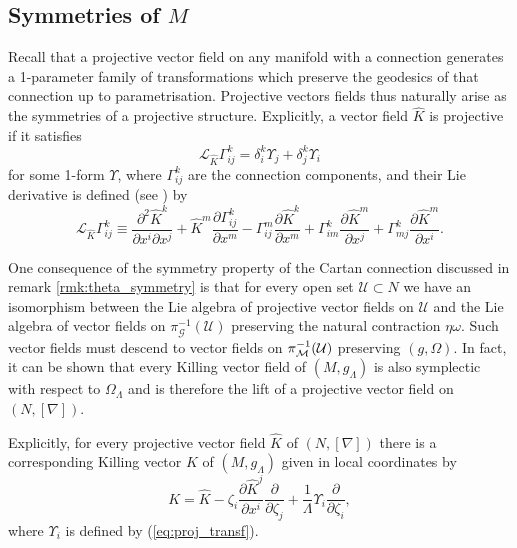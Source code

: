 \subsection{Symmetries of $M$}

Recall that a projective vector field on any manifold with a connection
generates a 1-parameter family of transformations which preserve the
geodesics of that connection up to parametrisation. Projective vectors
fields thus naturally arise as the symmetries of a projective structure.
Explicitly, a vector field $\widehat{K}$ is projective if it satisfies
\begin{equation}
\mathcal{L}_{\widehat{K}}\Gamma_{ij}^{k}=\delta_{i}^{k}\Upsilon_{j}+\delta_{j}^{k}\Upsilon_{i}\label{eq:proj_transf}
\end{equation}
for some 1-form $\Upsilon$, where $\Gamma_{ij}^{k}$ are the connection
components, and their Lie derivative is defined (see \cite{yano})
by
\begin{equation}
\mathcal{L}_{\widehat{K}}\Gamma_{ij}^{k}\equiv\frac{\partial^{2}\widehat{K}^{k}}{\partial x^{i}\partial x^{j}}+\widehat{K}^{m}\frac{\partial\Gamma_{ij}^{k}}{\partial x^{m}}-\Gamma_{ij}^{m}\frac{\partial \widehat{K}^{k}}{\partial x^{m}}+\Gamma_{im}^{k}\frac{\partial \widehat{K}^{m}}{\partial x^{j}}+\Gamma_{mj}^{k}\frac{\partial \widehat{K}^{m}}{\partial x^{i}}.\label{eq:liederivGamma}
\end{equation}


One consequence of the symmetry property of the Cartan connection discussed in remark \ref{rmk:theta_symmetry} is that for every open set $\mathcal{U}\subset N$ we have an isomorphism between the Lie algebra of projective vector fields on $\mathcal{U}$ and the Lie algebra of vector fields on $\pi_\mathcal{G}^{-1}(\mathcal{U})$ preserving the natural contraction $\eta\omega$. Such vector fields must descend to vector fields on $\pi_{\mathcal{M}}^{-1}(\mathcal{U})$ preserving $(g,\Omega)$. In fact, it can be shown that every Killing vector field of $(M,g_\Lambda)$ is also symplectic with respect to $\Omega_\Lambda$ and is therefore the lift of a projective vector field on $(N,[\nabla])$.

Explicitly, for every projective vector field $\widehat{K}$ of $(N,[\nabla])$
there is a corresponding Killing vector $K$ of $(M,g_{\Lambda})$
given in local coordinates by 
\begin{equation}
{K}=\widehat{K}-\zeta_{i}\frac{\partial \widehat{K}^{j}}{\partial x^{i}}\frac{\partial}{\partial \zeta_{j}}+\frac{1}{\Lambda}\Upsilon_{i}\frac{\partial}{\partial \zeta_{i}},\label{eq:kvf_from_pvf}
\end{equation}
where $\Upsilon_{i}$ is defined by (\ref{eq:proj_transf}).

